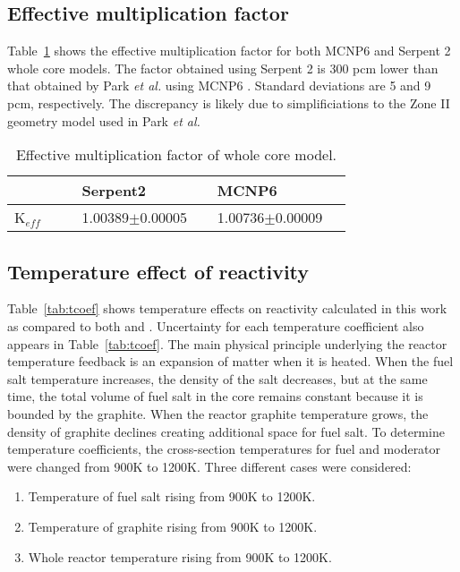 \subsection{Effective multiplication factor}
Table~\ref{tab:keff} shows the effective multiplication factor for both MCNP6 
and Serpent 2 whole core models. The factor obtained using Serpent 2 is 300 pcm 
lower than that obtained by Park \emph{et al.} using MCNP6 
\cite{park_whole_2015}. Standard deviations are 5 and 9 pcm, respectively. The 
discrepancy is likely due to simplificiations to the Zone II geometry model 
used in Park \emph{et al.}
\captionsetup[table]{
  labelsep = newline,
  name = TABLE, justification=justified,
  singlelinecheck=false,%
  labelsep=colon,%
  skip = \medskipamount}
\begin{table}[h!]
\caption{Effective multiplication factor of whole core model.}
\begin{tabular}{p{0.15\linewidth} p{0.3\linewidth} p{0.3\linewidth}} \toprule
      & Serpent2      & MCNP6 \cite{park_whole_2015}          \\ \midrule
K$_{eff}$  & 1.00389$\pm$0.00005 & 1.00736$\pm$0.00009
\\
\bottomrule
\end{tabular}
  \label{tab:keff}
\end{table}
\subsection{Temperature effect of reactivity}
Table~\ref{tab:tcoef} shows temperature effects on reactivity calculated in 
this work as compared to both \cite{park_whole_2015} and 
\cite{robertson_conceptual_1971}. Uncertainty for each temperature coefficient 
also appears in Table~\ref{tab:tcoef}. The main physical principle underlying 
the reactor temperature feedback is an expansion of matter when it is heated.  
When the fuel salt temperature increases, the density of the salt decreases, 
but at the same time, the total volume of fuel salt in the core remains 
constant because it is bounded by the graphite. When the reactor graphite 
temperature grows, the density of graphite declines creating additional space 
for fuel salt. To determine temperature coefficients, the cross-section 
temperatures for fuel and moderator were changed from 900K to 1200K. Three 
different cases were considered:
\begin{enumerate}  \item Temperature of fuel salt rising from 900K to 1200K.
\item Temperature of graphite rising from 900K to 1200K.  \item Whole reactor 
        temperature rising from 900K to 1200K.
\end{enumerate}

